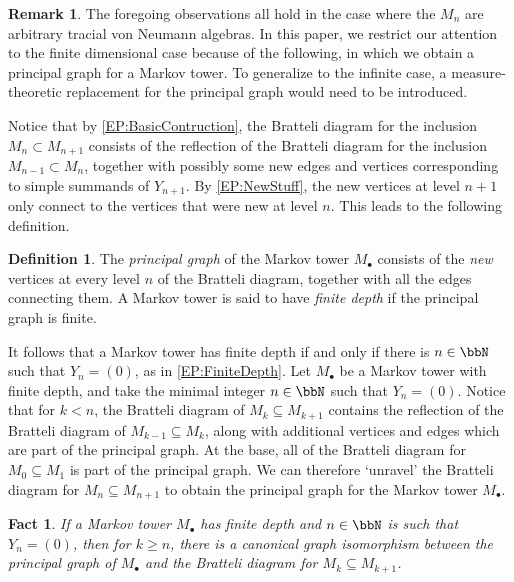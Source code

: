 \documentclass[11pt]{article}
\theoremstyle{plain}
\newtheorem{fact}[thm]{Fact}
\theoremstyle{definition}
\newtheorem{defn}[thm]{Definition}
\newtheorem{rem}[thm]{Remark}
\begin{document}
\begin{rem}
\label{rem:InfiniteDimensionalMarkovTower}
 The foregoing observations all hold in the case where the $M_n$ are arbitrary tracial von Neumann algebras. In this paper, we restrict our attention to the finite dimensional case because of the following, in which we obtain a principal graph for a Markov tower. To generalize to the infinite case, a measure-theoretic replacement for the principal graph would need to be introduced. 
\end{rem}


Notice that by \ref{EP:BasicContruction}, the Bratteli diagram for the inclusion $M_{n}\subset M_{n+1}$ consists of the reflection of the Bratteli diagram for the inclusion $M_{n-1} \subset M_n$, together with possibly some new edges and vertices corresponding to simple summands of $Y_{n+1}$. 
By \ref{EP:NewStuff}, the new vertices at level $n+1$ only connect to the vertices that were new at level $n$. This leads to the following definition.

\begin{defn}
The \emph{principal graph} of the Markov tower $M_\bullet$ consists of the \emph{new} vertices at every level $n$ of the Bratteli diagram, together with all the edges connecting them.
A Markov tower is said to have \emph{finite depth} if the principal graph is finite.
\end{defn}

It follows that a Markov tower has finite depth if and only if there is $n\in \bbN$ such that $Y_n = (0)$, as in \ref{EP:FiniteDepth}. 
Let $M_\bullet$ be a Markov tower with finite depth, and take the minimal integer $n\in \bbN$ such that $Y_n=(0)$. 
Notice that for $k<n$, the Bratteli diagram of $M_k\subseteq M_{k+1}$ contains the reflection of the Bratteli diagram of $M_{k-1}\subseteq M_{k}$, along with additional vertices and edges which are part of the principal graph. 
At the base, all of the Bratteli diagram for $M_0\subseteq M_1$ is part of the principal graph. 
We can therefore `unravel' the Bratteli diagram for $M_{n}\subseteq M_{n+1}$ to obtain the principal graph for the Markov tower $M_\bullet$.

\begin{fact}\label{Fact:BratteliPrincipal}
 If a Markov tower $M_\bullet$ has finite depth and $n\in \bbN$ is such that $Y_n=(0)$, then for $k\geq n$, there is a canonical graph isomorphism between the principal graph of $M_\bullet$ and the Bratteli diagram for $M_{k}\subseteq M_{k+1}$.
\end{fact}
\end{document}
